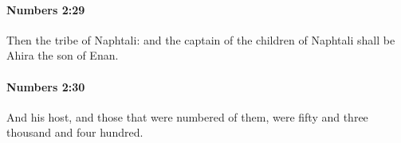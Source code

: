 		\paragraph{Numbers 2:29} %
			\label{NUMBERS-2-29}

			Then the tribe of Naphtali: and the captain of the children of Naphtali shall be Ahira the son of Enan.


		\paragraph{Numbers 2:30} %
			\label{NUMBERS-2-30}

			And his host, and those that were numbered of them, were fifty and three thousand and four hundred.


